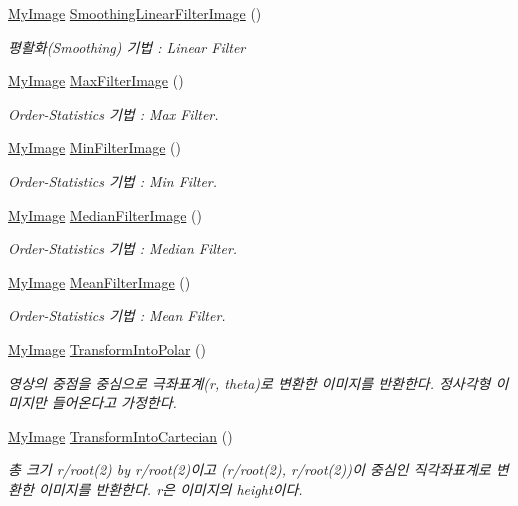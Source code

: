\begin{DoxyCompactItemize}
\hyperlink{class_my_image}{My\-Image} \hyperlink{class_my_image_ad7944b144f9744e17051878b4b50c951}{Smoothing\-Linear\-Filter\-Image} ()
\begin{DoxyCompactList}\small\item\em 평활화(\-Smoothing) 기법 \-: Linear Filter \end{DoxyCompactList}\item 
\hyperlink{class_my_image}{My\-Image} \hyperlink{class_my_image_a9c679fe0d1c067a40297ac805b02bfad}{Max\-Filter\-Image} ()
\begin{DoxyCompactList}\small\item\em Order-\/\-Statistics 기법 \-: Max Filter. \end{DoxyCompactList}\item 
\hyperlink{class_my_image}{My\-Image} \hyperlink{class_my_image_a258d1539f4841dd0c9f4453cd4b84b16}{Min\-Filter\-Image} ()
\begin{DoxyCompactList}\small\item\em Order-\/\-Statistics 기법 \-: Min Filter. \end{DoxyCompactList}\item 
\hyperlink{class_my_image}{My\-Image} \hyperlink{class_my_image_a642496d4037beaf9da663b8d1ad783d9}{Median\-Filter\-Image} ()
\begin{DoxyCompactList}\small\item\em Order-\/\-Statistics 기법 \-: Median Filter. \end{DoxyCompactList}\item 
\hyperlink{class_my_image}{My\-Image} \hyperlink{class_my_image_a2351ec80136c2ef0e44564443bcd95d6}{Mean\-Filter\-Image} ()
\begin{DoxyCompactList}\small\item\em Order-\/\-Statistics 기법 \-: Mean Filter. \end{DoxyCompactList}\item 
\hyperlink{class_my_image}{My\-Image} \hyperlink{class_my_image_a0bf6e1069067a1e6ac8d9fb6f9e4e16e}{Transform\-Into\-Polar} ()
\begin{DoxyCompactList}\small\item\em 영상의 중점을 중심으로 극좌표계(r, theta)로 변환한 이미지를 반환한다. 정사각형 이미지만 들어온다고 가정한다. \end{DoxyCompactList}\item 
\hyperlink{class_my_image}{My\-Image} \hyperlink{class_my_image_aa53e9b0fa696a4de66da49b13b9afd48}{Transform\-Into\-Cartecian} ()
\begin{DoxyCompactList}\small\item\em 총 크기 r/root(2) by r/root(2)이고 (r/root(2), r/root(2))이 중심인 직각좌표계로 변환한 이미지를 반환한다. r은 이미지의 height이다. \end{DoxyCompactList}\item 

\end{DoxyCompactItemize}
